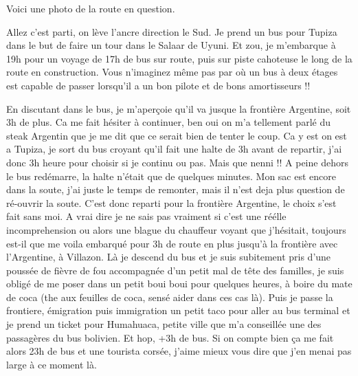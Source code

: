 \begin{multicols}{2}

Voici une photo de la route en question.


Allez c'est parti, on lève l'ancre direction le Sud. Je prend un bus pour Tupiza dans le but de faire un tour dans le Salaar de Uyuni. Et zou, je m'embarque à 19h pour un voyage de 17h de bus sur route, puis sur piste cahoteuse le long de la route en construction. Vous n'imaginez même pas par où un bus à deux étages est capable de passer lorsqu'il a un bon pilote et de bons amortisseurs !!



En discutant dans le bus, je m'aperçoie qu'il va jusque la frontière Argentine, soit 3h de plus. Ca me fait hésiter à continuer, ben oui on m'a tellement parlé du steak Argentin que je me dit que ce serait bien de tenter le coup. Ca y est on est a Tupiza, je sort du bus croyant qu'il fait une halte de 3h avant de repartir, j'ai donc 3h heure pour choisir si je continu ou pas. Mais que nenni !! A peine dehors le bus redémarre, la halte n'était que de quelques minutes. Mon sac est encore dans la soute, j'ai juste le temps de remonter, mais il n'est deja plus question de ré-ouvrir la soute. C'est donc reparti pour la frontière Argentine, le choix s'est fait sans moi. A vrai dire je ne sais pas vraiment si c'est une réélle incomprehension ou alors une blague du chauffeur voyant que j'hésitait, toujours est-il que me voila embarqué pour 3h de route en plus jusqu'à la frontière avec l'Argentine, à Villazon. Là je descend du bus et je suis subitement pris d'une poussée de fièvre de fou accompagnée d'un petit mal de tête des familles, je suis obligé de me poser dans un petit boui boui pour quelques heures, à boire du mate de coca (the aux feuilles de coca, sensé aider dans ces cas là). Puis je passe la frontiere, émigration puis immigration un petit taco pour aller au bus terminal et je prend un ticket pour Humahuaca, petite ville que m'a conseillée une des passagères du bus bolivien. Et hop, +3h de bus. Si on compte bien ça me fait alors 23h de bus et une tourista corsée, j'aime mieux vous dire que j'en menai pas large à ce moment là.


\end{multicols}
